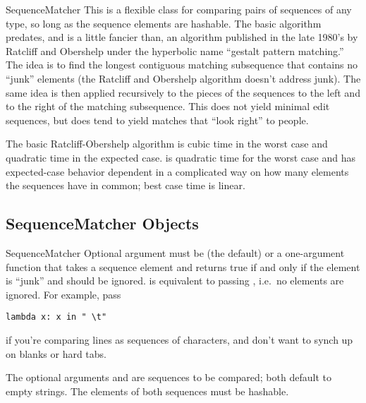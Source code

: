 \begin{classdesc}{SequenceMatcher}{\unspecified}
  This is a flexible class for comparing pairs of sequences of any
  type, so long as the sequence elements are hashable.  The basic
  algorithm predates, and is a little fancier than, an algorithm
  published in the late 1980's by Ratcliff and Obershelp under the
  hyperbolic name ``gestalt pattern matching.''  The idea is to find
  the longest contiguous matching subsequence that contains no
  ``junk'' elements (the Ratcliff and Obershelp algorithm doesn't
  address junk).  The same idea is then applied recursively to the
  pieces of the sequences to the left and to the right of the matching
  subsequence.  This does not yield minimal edit sequences, but does
  tend to yield matches that ``look right'' to people.

   The basic Ratcliff-Obershelp algorithm is cubic
  time in the worst case and quadratic time in the expected case.
   is quadratic time for the worst case and has
  expected-case behavior dependent in a complicated way on how many
  elements the sequences have in common; best case time is linear.
\end{classdesc}


\begin{seealso}
\end{seealso}


\subsection{SequenceMatcher Objects \label{sequence-matcher}}

\begin{classdesc}{SequenceMatcher}{}
  Optional argument  must be  (the default) or
  a one-argument function that takes a sequence element and returns
  true if and only if the element is ``junk'' and should be ignored.
   is equivalent to passing , i.e.\ no
  elements are ignored.  For example, pass

\begin{verbatim}
lambda x: x in " \t"
\end{verbatim}

  if you're comparing lines as sequences of characters, and don't want
  to synch up on blanks or hard tabs.

  The optional arguments  and  are sequences to be
  compared; both default to empty strings.  The elements of both
  sequences must be hashable.
\end{classdesc}


